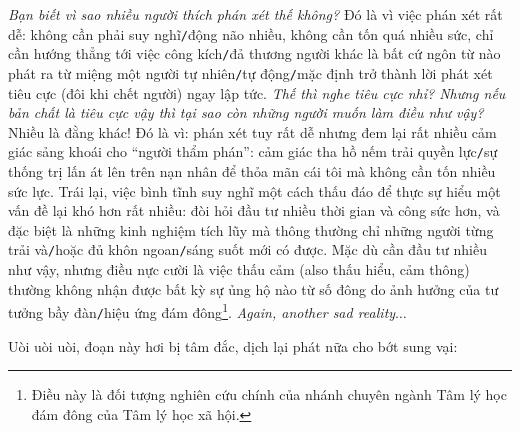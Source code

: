 \documentclass[12pt]{article}
\begin{document}
{\it Bạn biết vì sao nhiều người thích phán xét thế không?} Đó là vì việc phán xét rất dễ: không cần phải suy nghĩ{\tt/}động não nhiều, không cần tốn quá nhiều sức, chỉ cần hướng thẳng tới việc công kích{\tt/}đả thương người khác là bất cứ ngôn từ nào phát ra từ miệng một người tự nhiên{\tt/}tự động{\tt/}mặc định trở thành lời phát xét tiêu cực (đôi khi chết người) ngay lập tức. {\it Thế thì nghe tiêu cực nhỉ? Nhưng nếu bản chất là tiêu cực vậy thì tại sao còn những người muốn làm điều như vậy?} Nhiều là đằng khác! Đó là vì: phán xét tuy rất dễ nhưng đem lại rất nhiều cảm giác sảng khoái cho ``người thẩm phán'': cảm giác tha hồ nếm trải quyền lực{\tt/}sự thống trị  lấn át lên trên nạn nhân để thỏa mãn cái tôi mà không cần tốn nhiều sức lực. Trái lại, việc bình tĩnh suy nghĩ một cách thấu đáo để thực sự hiểu một vấn đề lại khó hơn rất nhiều: đòi hỏi đầu tư nhiều thời gian và công sức hơn, và đặc biệt là những kinh nghiệm tích lũy mà thông thường chỉ những người từng trải và{\tt/}hoặc đủ khôn ngoan{\tt/}sáng suốt mới có được. Mặc dù cần đầu tư nhiều như vậy, nhưng điều nực cười là việc thấu cảm (also thấu hiểu, cảm thông) thường không nhận được bất kỳ sự ủng hộ nào từ số đông do ảnh hưởng của tư tưởng bầy đàn{\tt/}hiệu ứng đám đông\footnote{Điều này là đối tượng nghiên cứu chính của nhánh chuyên ngành Tâm lý học đám đông của Tâm lý học xã hội.}. {\it Again, another sad reality}$\ldots$

Uòi uòi uòi, đoạn này hơi bị tâm đắc, dịch lại phát nữa cho bớt sung vại:
\end{document}
